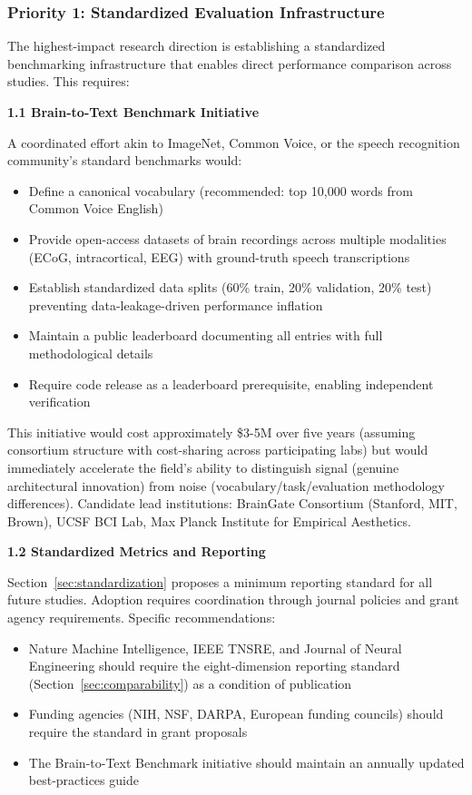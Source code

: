 \subsubsection{Priority 1: Standardized Evaluation Infrastructure}

The highest-impact research direction is establishing a standardized benchmarking infrastructure that enables direct performance comparison across studies. This requires:

\textbf{1.1 Brain-to-Text Benchmark Initiative}

A coordinated effort akin to ImageNet, Common Voice, or the speech recognition community's standard benchmarks would:

\begin{itemize}
    \item Define a canonical vocabulary (recommended: top 10,000 words from Common Voice English)
    \item Provide open-access datasets of brain recordings across multiple modalities (ECoG, intracortical, EEG) with ground-truth speech transcriptions
    \item Establish standardized data splits (60\% train, 20\% validation, 20\% test) preventing data-leakage-driven performance inflation
    \item Maintain a public leaderboard documenting all entries with full methodological details
    \item Require code release as a leaderboard prerequisite, enabling independent verification
\end{itemize}

This initiative would cost approximately \$3-5M over five years (assuming consortium structure with cost-sharing across participating labs) but would immediately accelerate the field's ability to distinguish signal (genuine architectural innovation) from noise (vocabulary/task/evaluation methodology differences). Candidate lead institutions: BrainGate Consortium (Stanford, MIT, Brown), UCSF BCI Lab, Max Planck Institute for Empirical Aesthetics.

\textbf{1.2 Standardized Metrics and Reporting}

Section~\ref{sec:standardization} proposes a minimum reporting standard for all future studies. Adoption requires coordination through journal policies and grant agency requirements. Specific recommendations:

\begin{itemize}
    \item Nature Machine Intelligence, IEEE TNSRE, and Journal of Neural Engineering should require the eight-dimension reporting standard (Section~\ref{sec:comparability}) as a condition of publication
    \item Funding agencies (NIH, NSF, DARPA, European funding councils) should require the standard in grant proposals
    \item The Brain-to-Text Benchmark initiative should maintain an annually updated best-practices guide
\end{itemize}

